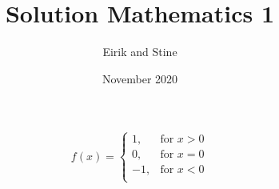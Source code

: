 \documentclass{article}
\title{Solution Mathematics 1}
\author{Eirik and Stine}
\date{November 2020}
\begin{document}
\maketitle

\[f(x)=
\begin{cases}
   1,&\text{for }x>0\\
   0,&\text{for }x=0\\
   -1,&\text{for }x<0\\
\end{cases}\]
\end{document}
